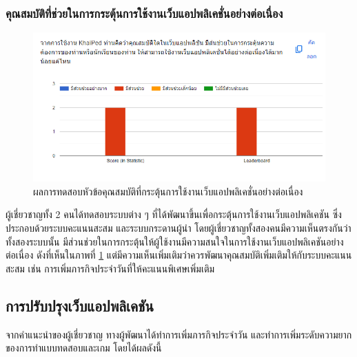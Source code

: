\documentclass[12pt,oneside,openright,a4paper]{cpe-thai-project}
\begin{document}
\subsubsection{คุณสมบัติที่ช่วยในการกระตุ้นการใช้งานเว็บแอปพลิเคชั่นอย่างต่อเนื่อง}
\hspace{1cm}
\begin{figure}[!h]\centering
	\includegraphics[width=\textwidth, keepaspectratio=true]{image/appendix/2nd/addict.png}
	\caption{{ผลการทดสอบหัวข้อคุณสมบัติที่กระตุ้นการใช้งานเว็บแอปพลิเคชั่นอย่างต่อเนื่อง}}\label{fig:apdx2ndFeature2}
\end{figure} 
\hspace{1cm}
ผู้เชี่ยวชาญทั้ง 2 คนได้ทดสอบระบบต่าง ๆ ที่ได้พัฒนาขึ้นเพื่อกระตุ้นการใช้งานเว็บแอปพลิเคชัน ซึ่งประกอบด้วยระบบคะแนนสะสม และระบบกระดานผู้นำ
โดยผู้เชี่ยวชาญทั้งสองคนมีความเห็นตรงกันว่าทั้งสองระบบนั้น มีส่วนช่วยในการกระตุ้นให้ผู้ใช้งานมีความสนใจในการใช้งานเว็บแอปพลิเคชันอย่างต่อเนื่อง
ดังที่เห็นในภาพที่ \ref{fig:apdx2ndFeature2}
แต่มีความเห็นเพิ่มเติมว่าควรพัฒนาคุณสมบัติเพิ่มเติมให้กับระบบคะแนนสะสม เช่น การเพิ่มภารกิจประจำวันที่ให้คะแนนพิเศษเพิ่มเติม 

\pagebreak
\subsection{การปรับปรุงเว็บแอปพลิเคชัน}
\hspace{1cm}
จากคำแนะนำของผู้เชี่ยวชาญ ทางผู้พัฒนาได้ทำการเพิ่มภารกิจประจำวัน และทำการเพิ่มระดับความยากของการทำแบบทดสอบและเกม
โดยได้ผลดังนี้
\end{document}
